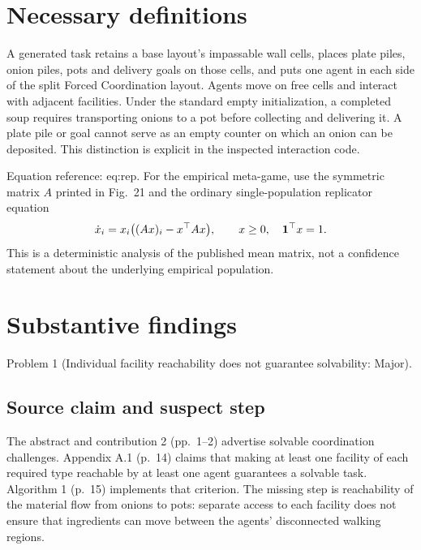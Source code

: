 \documentclass[10pt]{article}
\begin{document}
\section*{Necessary definitions}
A generated task retains a base layout’s impassable wall cells, places plate piles, onion piles, pots and delivery goals on those cells, and puts one agent in each side of the split Forced Coordination layout. Agents move on free cells and interact with adjacent facilities. Under the standard empty initialization, a completed soup requires transporting onions to a pot before collecting and delivering it. A plate pile or goal cannot serve as an empty counter on which an onion can be deposited. This distinction is explicit in the inspected interaction code.\par
Equation reference: eq:rep. For the empirical meta-game, use the symmetric matrix \(A\) printed in Fig. 21 and the ordinary single-population replicator equation \[
 \dot x_i=x_i\bigl((Ax)_i-x^\top Ax\bigr),\qquad x\geq0,\quad {\bf1}^\top x=1.\] This is a deterministic analysis of the published mean matrix, not a confidence statement about the underlying empirical population.\par
\section*{Substantive findings}
Problem 1 (Individual facility reachability does not guarantee solvability: Major).\par
\subsection*{Source claim and suspect step}
The abstract and contribution 2 (pp. 1–2) advertise solvable coordination challenges. Appendix A.1 (p. 14) claims that making at least one facility of each required type reachable by at least one agent guarantees a solvable task. Algorithm 1 (p. 15) implements that criterion. The missing step is reachability of the material flow from onions to pots: separate access to each facility does not ensure that ingredients can move between the agents’ disconnected walking regions.\par
\end{document}
